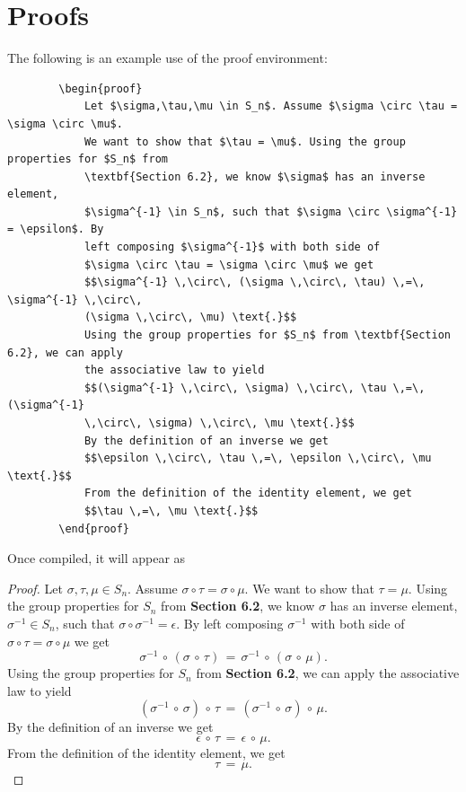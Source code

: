 \documentclass[]{article}
\newcommand{\dent}{\hspace{\parindent}} %
\begin{document}
    \section{Proofs}
    \dent The following is an example use of the proof environment:
    \begin{verbatim}
        \begin{proof}
            Let $\sigma,\tau,\mu \in S_n$. Assume $\sigma \circ \tau = \sigma \circ \mu$. 
            We want to show that $\tau = \mu$. Using the group properties for $S_n$ from 
            \textbf{Section 6.2}, we know $\sigma$ has an inverse element, 
            $\sigma^{-1} \in S_n$, such that $\sigma \circ \sigma^{-1} = \epsilon$. By 
            left composing $\sigma^{-1}$ with both side of 
            $\sigma \circ \tau = \sigma \circ \mu$ we get
            $$\sigma^{-1} \,\circ\, (\sigma \,\circ\, \tau) \,=\, \sigma^{-1} \,\circ\, 
            (\sigma \,\circ\, \mu) \text{.}$$
            Using the group properties for $S_n$ from \textbf{Section 6.2}, we can apply 
            the associative law to yield
            $$(\sigma^{-1} \,\circ\, \sigma) \,\circ\, \tau \,=\, (\sigma^{-1} 
            \,\circ\, \sigma) \,\circ\, \mu \text{.}$$
            By the definition of an inverse we get
            $$\epsilon \,\circ\, \tau \,=\, \epsilon \,\circ\, \mu \text{.}$$
            From the definition of the identity element, we get
            $$\tau \,=\, \mu \text{.}$$
        \end{proof}
    \end{verbatim}
    Once compiled, it will appear as
    \begin{proof}
        Let $\sigma,\tau,\mu \in S_n$. Assume $\sigma \circ \tau = \sigma \circ \mu$. We want to show that $\tau = \mu$. Using the group properties for $S_n$ from \textbf{Section 6.2}, we know $\sigma$ has an inverse element, $\sigma^{-1} \in S_n$, such that $\sigma \circ \sigma^{-1} = \epsilon$. By left composing $\sigma^{-1}$ with both side of $\sigma \circ \tau = \sigma \circ \mu$ we get
        $$\sigma^{-1} \,\circ\, (\sigma \,\circ\, \tau) \,=\, \sigma^{-1} \,\circ\, (\sigma \,\circ\, \mu) \text{.}$$
        Using the group properties for $S_n$ from \textbf{Section 6.2}, we can apply the associative law to yield
        $$(\sigma^{-1} \,\circ\, \sigma) \,\circ\, \tau \,=\, (\sigma^{-1} \,\circ\, \sigma) \,\circ\, \mu \text{.}$$
        By the definition of an inverse we get
        $$\epsilon \,\circ\, \tau \,=\, \epsilon \,\circ\, \mu \text{.}$$
        From the definition of the identity element, we get
        $$\tau \,=\, \mu \text{.}$$
    \end{proof}
\end{document}
